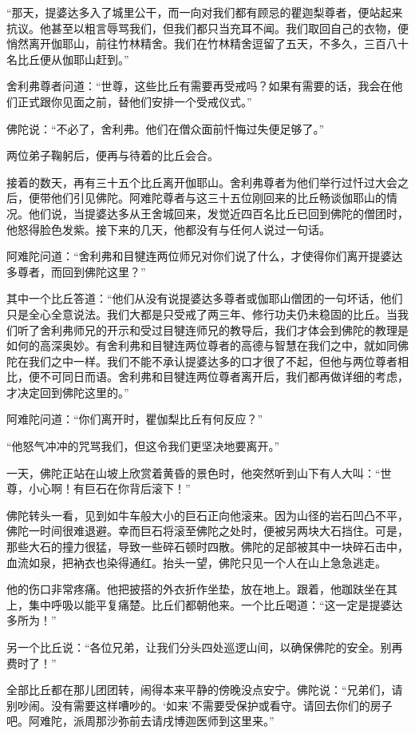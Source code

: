 \documentclass[12pt,twoside,openany]{book}
\begin{document}
“那天，提婆达多入了城里公干，而一向对我们都有顾忌的瞿迦梨尊者，便站起来抗议。他甚至以粗言辱骂我们，但我们都只当充耳不闻。我们取回自己的衣物，便悄然离开伽耶山，前往竹林精舍。我们在竹林精舍逗留了五天，不多久，三百八十名比丘便从伽耶山赶到。”

舍利弗尊者问道：“世尊，这些比丘有需要再受戒吗？如果有需要的话，我会在他们正式跟你见面之前，替他们安排一个受戒仪式。”

佛陀说：“不必了，舍利弗。他们在僧众面前忏悔过失便足够了。”

两位弟子鞠躬后，便再与待着的比丘会合。

接着的数天，再有三十五个比丘离开伽耶山。舍利弗尊者为他们举行过忏过大会之后，便带他们引见佛陀。阿难陀尊者与这三十五位刚回来的比丘畅谈伽耶山的情况。他们说，当提婆达多从王舍城回来，发觉近四百名比丘已回到佛陀的僧团时，他怒得脸色发紫。接下来的几天，他都没有与任何人说过一句话。

阿难陀问道：“舍利弗和目犍连两位师兄对你们说了什么，才使得你们离开提婆达多尊者，而回到佛陀这里？”

其中一个比丘答道：“他们从没有说提婆达多尊者或伽耶山僧团的一句坏话，他们只是全心全意说法。我们大都是只受戒了两三年、修行功夫仍未稳固的比丘。当我们听了舍利弗师兄的开示和受过目犍连师兄的教导后，我们才体会到佛陀的教理是如何的高深奥妙。有舍利弗和目犍连两位尊者的高德与智慧在我们之中，就如同佛陀在我们之中一样。我们不能不承认提婆达多的口才很了不起，但他与两位尊者相比，便不可同日而语。舍利弗和目犍连两位尊者离开后，我们都再做详细的考虑，才决定回到佛陀这里的。”

阿难陀问道：“你们离开时，瞿伽梨比丘有何反应？”

“他怒气冲冲的咒骂我们，但这令我们更坚决地要离开。”

一天，佛陀正站在山坡上欣赏着黄昏的景色时，他突然听到山下有人大叫：“世尊，小心啊！有巨石在你背后滚下！”

佛陀转头一看，见到如牛车般大小的巨石正向他滚来。因为山径的岩石凹凸不平，佛陀一时间很难退避。幸而巨石将滚至佛陀之处时，便被另两块大石挡住。可是，那些大石的撞力很猛，导致一些碎石顿时四散。佛陀的足部被其中一块碎石击中，血流如泉，把衲衣也染得通红。抬头一望，佛陀只见一个人在山上急急逃走。

他的伤口非常疼痛。他把披搭的外衣折作坐垫，放在地上。跟着，他跏趺坐在其上，集中呼吸以能平复痛楚。比丘们都朝他来。一个比丘喝道：“这一定是提婆达多所为！”

另一个比丘说：“各位兄弟，让我们分头四处巡逻山间，以确保佛陀的安全。别再费时了！”

全部比丘都在那儿团团转，闹得本来平静的傍晚没点安宁。佛陀说：“兄弟们，请别吵闹。没有需要这样嘈吵的。‘如来’不需要受保护或看守。请回去你们的房子吧。阿难陀，派周那沙弥前去请戌博迦医师到这里来。”
\end{document}
